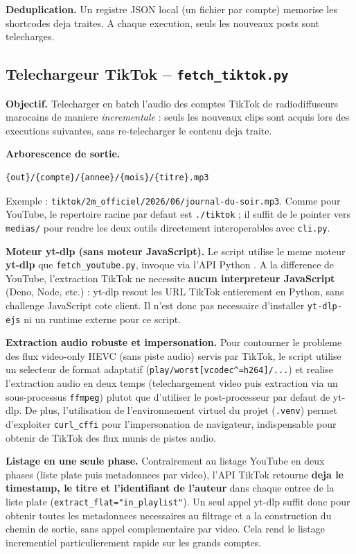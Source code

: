 \documentclass[11pt, a4paper]{article}
\begin{document}
\textbf{Deduplication.} Un registre JSON local (un fichier par compte) memorise les
shortcodes deja traites. A chaque execution, seuls les nouveaux posts sont telecharges.

\subsection{Telechargeur TikTok -- \texttt{fetch\_tiktok.py}}

\textbf{Objectif.} Telecharger en batch l'audio des comptes TikTok de radiodiffuseurs
marocains de maniere \emph{incrementale} : seuls les nouveaux clips sont acquis lors
des executions suivantes, sans re-telecharger le contenu deja traite.

\textbf{Arborescence de sortie.}
\begin{lstlisting}
{out}/{compte}/{annee}/{mois}/{titre}.mp3
\end{lstlisting}
Exemple : \texttt{tiktok/2m\_officiel/2026/06/journal-du-soir.mp3}.
Comme pour YouTube, le repertoire racine par defaut est \texttt{./tiktok} ;
il suffit de le pointer vers \texttt{medias/} pour rendre les deux outils
directement interoperables avec \texttt{cli.py}.

\textbf{Moteur yt-dlp (sans moteur JavaScript).} Le script utilise le meme
moteur \textbf{yt-dlp} que \texttt{fetch\_youtube.py}, invoque via l'API Python
. A la difference de YouTube, l'extraction TikTok ne necessite
\textbf{aucun interpreteur JavaScript} (Deno, Node, etc.) : yt-dlp resout les
URL TikTok entierement en Python, sans challenge JavaScript cote client. Il n'est
donc pas necessaire d'installer \texttt{yt-dlp-ejs} ni un runtime externe pour
ce script.

\textbf{Extraction audio robuste et impersonation.} Pour contourner le probleme des flux video-only HEVC (sans piste audio) servis par TikTok, le script utilise un selecteur de format adaptatif (\texttt{play/worst[vcodec\^{}=h264]/...}) et realise l'extraction audio en deux temps (telechargement video puis extraction via un sous-processus \texttt{ffmpeg}) plutot que d'utiliser le post-processeur par defaut de yt-dlp. De plus, l'utilisation de l'environnement virtuel du projet (\texttt{.venv}) permet d'exploiter \texttt{curl\_cffi} pour l'impersonation de navigateur, indispensable pour obtenir de TikTok des flux munis de pistes audio.

\textbf{Listage en une seule phase.} Contrairement au listage YouTube en deux
phases (liste plate puis metadonnees par video), l'API TikTok retourne
\textbf{deja le timestamp, le titre et l'identifiant de l'auteur} dans chaque
entree de la liste plate (\texttt{extract\_flat="in\_playlist"}). Un seul appel
yt-dlp suffit donc pour obtenir toutes les metadonnees necessaires au filtrage
et a la construction du chemin de sortie, sans appel complementaire par video.
Cela rend le listage incrementiel particulierement rapide sur les grands comptes.
\end{document}
